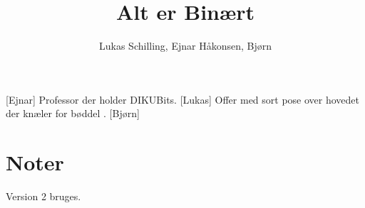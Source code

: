 \documentclass[a4paper,11pt]{article}
\title{Alt er Binært}
\author{Lukas Schilling, Ejnar Håkonsen, Bjørn}
\begin{document}
\maketitle

\begin{roles}
[Ejnar] Professor der holder DIKUBits.
[Lukas] Offer med sort pose over hovedet der knæler for bøddel .
[Bjørn]
\end{roles} 

\section*{Noter}
Version 2 bruges.

\begin{props}
\end{props}
\end{document}
